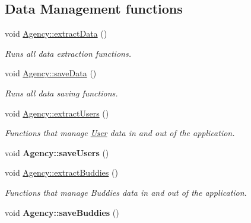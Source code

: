 \subsection*{Data Management functions}
\begin{DoxyCompactItemize}
\item 
void \hyperlink{group___agency_ga20bc20b90914b5e446b683dcd7f6d0ef}{Agency\+::extract\+Data} ()
\begin{DoxyCompactList}\small\item\em Runs all data extraction functions. \end{DoxyCompactList}\item 
\mbox{\label{group___agency_ga67c29f4711b1596630ae970e6a9027ac}} 
void \hyperlink{group___agency_ga67c29f4711b1596630ae970e6a9027ac}{Agency\+::save\+Data} ()
\begin{DoxyCompactList}\small\item\em Runs all data saving functions. \end{DoxyCompactList}\item 
\mbox{\label{group___agency_ga659e4c6df03779b524f37b1c8fb5221d}} 
void \hyperlink{group___agency_ga659e4c6df03779b524f37b1c8fb5221d}{Agency\+::extract\+Users} ()
\begin{DoxyCompactList}\small\item\em Functions that manage \hyperlink{class_user}{User} data in and out of the application. \end{DoxyCompactList}\item 
\mbox{\label{group___agency_gaf253026d4b2a377822d4e3c1ef680e6c}} 
void {\bfseries Agency\+::save\+Users} ()
\item 
\mbox{\label{group___agency_ga93c45528d2114a557a1e0b23498e178a}} 
void \hyperlink{group___agency_ga93c45528d2114a557a1e0b23498e178a}{Agency\+::extract\+Buddies} ()
\begin{DoxyCompactList}\small\item\em Functions that manage Buddies data in and out of the application. \end{DoxyCompactList}\item 
\mbox{\label{group___agency_ga6dc773d5c105563da2019dd062eb7918}} 
void {\bfseries Agency\+::save\+Buddies} ()
\item 

\end{DoxyCompactItemize}
